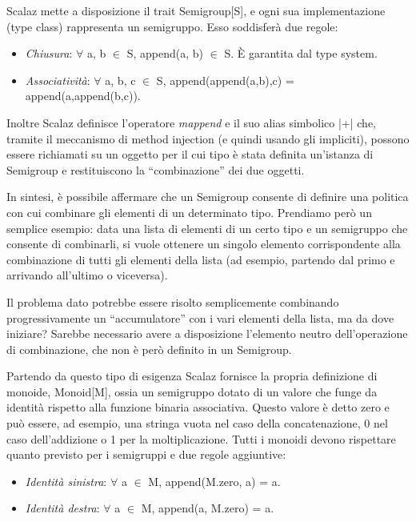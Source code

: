 Scalaz mette a disposizione il trait Semigroup[S], e ogni sua implementazione (type class) rappresenta un semigruppo. Esso soddisferà due regole:

\begin{itemize}
\item \textit{Chiusura}: $\forall$ a, b $\in$ S, append(a, b) $\in$ S. È garantita dal type system.
\item \textit{Associatività}: $\forall$ a, b, c $\in$ S, append(append(a,b),c) = append(a,append(b,c)).
\end{itemize}

Inoltre Scalaz definisce l'operatore \textit{mappend} e il suo alias simbolico |+| che, tramite il meccanismo di method injection (e quindi usando gli impliciti), possono essere richiamati su un oggetto per il cui tipo è stata definita un'istanza di Semigroup e restituiscono la ``combinazione'' dei due oggetti.



In sintesi, è possibile affermare che un Semigroup consente di definire una politica con cui combinare gli elementi di un determinato tipo. Prendiamo però un semplice esempio: data una lista di elementi di un certo tipo e un semigruppo che consente di combinarli, si vuole ottenere un singolo elemento corrispondente alla combinazione di tutti gli elementi della lista (ad esempio, partendo dal primo e arrivando all'ultimo o viceversa).

Il problema dato potrebbe essere risolto semplicemente combinando progressivamente un ``accumulatore'' con i vari elementi della lista, ma da dove iniziare? Sarebbe necessario avere a disposizione l'elemento neutro dell'operazione di combinazione, che non è però definito in un Semigroup.

Partendo da questo tipo di esigenza Scalaz fornisce la propria definizione di monoide, Monoid[M], ossia un semigruppo dotato di un valore che funge da identità rispetto alla funzione binaria associativa. Questo valore è detto zero e può essere, ad esempio, una stringa vuota nel caso della concatenazione, 0 nel caso dell'addizione o 1 per la moltiplicazione. Tutti i monoidi devono rispettare quanto previsto per i semigruppi e due regole aggiuntive:

\begin{itemize}
\item \textit{Identità sinistra}: $\forall$ a $\in$ M, append(M.zero, a) = a.
\item \textit{Identità destra}: $\forall$ a $\in$ M, append(a, M.zero) = a.
\end{itemize}

